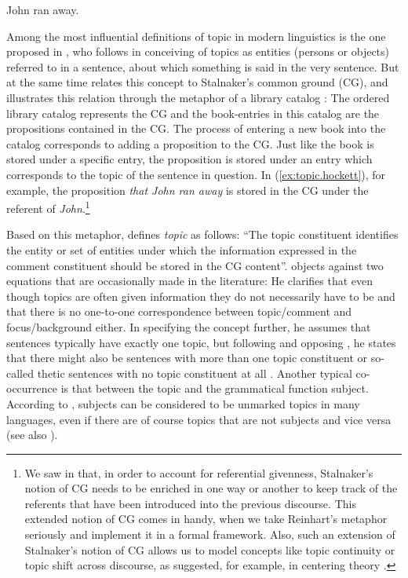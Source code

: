 \documentclass[output=paper,colorlinks,citecolor=brown]{langscibook}
\begin{document}
\ea \label{ex:topic.hockett}
John ran away.\hfill \citep[201]{hockett1958}
\z

Among the most influential definitions of topic in modern linguistics is the one proposed in \citet{reinhart1981}, who follows \citet{hockett1958} in conceiving of topics as entities (persons or objects) referred to in a sentence, about which something is said in the very sentence. But at the same time \citeauthor{reinhart1981} relates this concept to Stalnaker's common ground (CG), and illustrates this relation through the metaphor of a library catalog \citep[79--80]{reinhart1981}: The ordered library catalog represents the CG and the book-entries in this catalog are the propositions contained in the CG. The process of entering a new book into the catalog corresponds to adding a proposition to the CG. Just like the book is stored under a specific entry, the proposition is stored under an entry which corresponds to the topic of the sentence in question. In (\ref{ex:topic.hockett}), for example, the proposition \textit{that John ran away} is stored in the CG under the referent of \textit{John}.\footnote{We saw in  that, in order to account for referential givenness, Stalnaker's notion of CG needs to be enriched in one way or another to keep track of the referents that have been introduced into the previous discourse. This extended notion of CG comes in handy, when we take Reinhart's metaphor seriously and implement it in a formal framework. Also, such an extension of Stalnaker's notion of CG allows us to model concepts like topic continuity or topic shift across discourse, as suggested, for example, in centering theory \citep{walker.etal1998}.}

Based on this metaphor, \citet[41]{krifka2007} defines \textit{topic} as follows: ``The topic constituent identifies the entity or set of entities under which the information expressed in the comment constituent should be stored in the CG content''. \citet[41--42]{krifka2007} objects against two equations that are occasionally made in the literature: He clarifies that even though topics are often given information they do not necessarily have to be and that there is no one-to-one correspondence between topic/comment and focus/background either. In specifying the concept further, he assumes that sentences typically have exactly one topic, but following \citet{lambrecht1994} and opposing \citet{reinhart1981}, he states that there might also be sentences with more than one topic constituent or so-called thetic sentences with no topic constituent at all \citep[42--43]{krifka2007}. Another typical co-occurrence is that between the topic and the grammatical function subject. According to \citet[132]{lambrecht1994}, subjects can be considered to be unmarked topics in many languages, even if there are of course topics that are not subjects and vice versa (see also \cite[62]{reinhart1981}).
\end{document}
